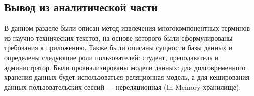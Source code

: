 \subsection{Вывод из аналитической части}

В данном разделе были описан метод извлечения многокомпонентных терминов из научно-технических текстов, на основе которого были сформулированы требования к приложению. Также были описаны сущности базы данных и определены следующие роли пользователей: студент, преподаватель и администратор. Были проанализированы модели данных: для долговременного хранения данных будет использоваться реляционная модель, а для кеширования данных пользовательских сессий --- нереляционная (In-Memory хранилище).



\pagebreak